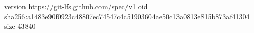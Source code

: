 version https://git-lfs.github.com/spec/v1
oid sha256:a1483e90f0923c48807ec74547c4c51903604ae50c13a0813e815b873af41304
size 43840
